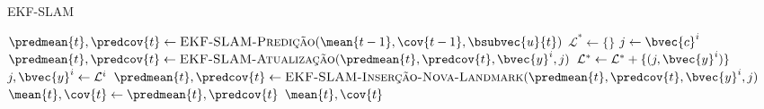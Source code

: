 \begin{algorithm}[h]
  \caption{EKF-SLAM}
  \label{alg:ekf-slam-full}
\begin{algorithmic}[1]
    \State $\predmean{t}, \predcov{t} \gets \textproc{EKF-SLAM-Predição}(\mean{t-1}, \cov{t-1}, \bsubvec{u}{t})$
    \State $\mathcal{L}^{*} \gets \{\}$ 
      \State $j \gets \bvec{c}^i$
        \State $\predmean{t}, \predcov{t} \gets \textproc{EKF-SLAM-Atualização}(\predmean{t}, \predcov{t}, \bvec{y}^i, j)$
      \Else
        \State $\mathcal{L}^* \gets \mathcal{L}^* + \{(j, \bvec{y}^i)\}$
      \EndIf
    \EndFor
      \State $j, \bvec{y}^i \gets \mathcal{L}^i$
      \State $\predmean{t}, \predcov{t} \gets \textproc{EKF-SLAM-Inserção-Nova-Landmark}(\predmean{t}, \predcov{t}, \bvec{y}^i, j)$
    \EndFor
    \State $\mean{t}, \cov{t} \gets \predmean{t}, \predcov{t}$
    \State \Return $\mean{t}, \cov{t}$
  \EndProcedure
\end{algorithmic}
\end{algorithm}